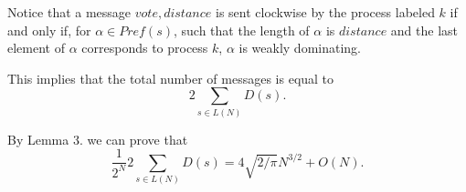 \documentclass[a4paper,12pt]{article}
\begin{document}
Notice that a message $vote, distance$ is sent clockwise by the process labeled $k$ if and only if, for $\alpha \in Pref(s)$, such that the length of $\alpha$ is $distance$ and the last element of $\alpha$ corresponds to process $k$, $\alpha$ is weakly dominating.

This implies that the total number of messages is equal to 
$$2\sum_{s\in L(N)} D(s).$$

By Lemma 3. we can prove that
$$\frac{1}{2^N} 2 \sum_{s\in L(N)} D(s) = 4\sqrt{2/\pi} N^{3/2} + O(N).$$

\printbibliography
\end{document}
